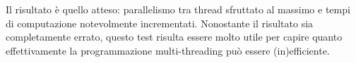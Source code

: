 \documentclass[12pt,a4paper,openright,oneside]{report}
\renewcommand{\chaptermark}[1]{\markboth{\thechapter.\ #1}{}}
\begin{document}
Il risultato è quello atteso: parallelismo tra thread sfruttato al massimo e tempi di computazione notevolmente incrementati. Nonostante il risultato sia completamente errato, questo test risulta essere molto utile per capire quanto effettivamente la programmazione multi-threading può essere (in)efficiente.\\


\renewcommand{\chaptermark}[1]{\markright{\thechapter \ #1}{}}
\lhead[\fancyplain{}{\bfseries\thepage}]{\fancyplain{}{\bfseries\rightmark}}


\nocite{RareDiseaseWiki, RareDiseaseUE, PrivacyCode, PrivacyCodeWiki,
PrivacyCodeDescription, PersonalData, ISO27001, EuropeanRegulationIntroduction, InternationalTransfer,
GuarantorSite}
\end{document}
